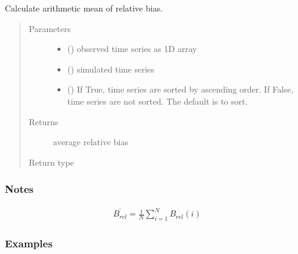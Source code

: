 \documentclass[letterpaper,10pt,english]{sphinxmanual}
\begin{document}
\begin{fulllineitems}
\label{\detokenize{reference/de:de.de.calc_brel_mean}}
Calculate arithmetic mean of relative bias.
\begin{quote}\begin{description}
\item[{Parameters}] \leavevmode\begin{itemize}
\item {} 
 (\sphinxstyleliteralemphasis{\sphinxupquote{(}}\sphinxstyleliteralemphasis{\sphinxupquote{,}}\sphinxstyleliteralemphasis{\sphinxupquote{)}}) \textendash{} observed time series as 1\sphinxhyphen{}D array

\item {} 
 (\sphinxstyleliteralemphasis{\sphinxupquote{(}}\sphinxstyleliteralemphasis{\sphinxupquote{,}}\sphinxstyleliteralemphasis{\sphinxupquote{)}}) \textendash{} simulated time series

\item {} 
 (\sphinxstyleliteralemphasis{\sphinxupquote{, }}) \textendash{} If True, time series are sorted by ascending order. If False, time
series are not sorted. The default is to sort.

\end{itemize}

\item[{Returns}] \leavevmode
{} \textendash{} average relative bias

\item[{Return type}] \leavevmode
{}

\end{description}\end{quote}
\subsubsection*{Notes}
\begin{equation*}
\begin{split}\overline{B_{rel}} = \frac{1}{N}\sum_{i=1}^{N} B_{rel}(i)\end{split}
\end{equation*}\subsubsection*{Examples}


\end{fulllineitems}
\end{document}
